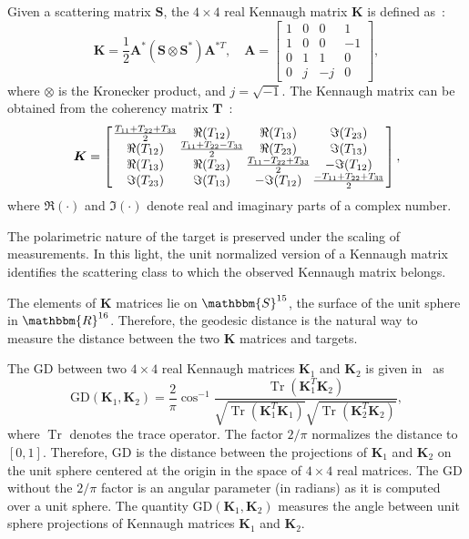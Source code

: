 \documentclass[journal]{IEEEtran}
\DeclareMathOperator{\Tr}{Tr}
\begin{document}
	Given a scattering matrix $\bm{S}$, the $4 \times 4$ real Kennaugh matrix $\bm{K}$ is defined as~\cite{Pottier09}:
	\begin{equation}
		\bm{K} = \frac{1}{2}\bm{A}^*(\bm{S} \otimes \bm{S}^*) \bm{A}^{*T}, \quad \bm{A} = \left[
		\begin{array}{cccc}
			1 & 0 & 0 & 1\\
			1 & 0 & 0 & -1\\
			0 & 1 & 1 & 0\\
			0 & j & -j & 0
		\end{array}\right],
	\end{equation}
	where $\otimes$ is the Kronecker product, and  $j = \sqrt{-1}$.
	The Kennaugh matrix can be obtained from the coherency matrix $\bm{T}$~\cite{PolarisationApplicationsRemoteSensing}:
	\begin{equation}
		\label{incoKen}
		\bm{K} =
		\left[\arraycolsep=.7pt
		\begin{array}{cccc}
			\frac{T_{11}+T_{22}+ T_{33}}{2} & \Re(T_{12}) & \Re(T_{13}) & \Im(T_{23})\\
			\Re(T_{12}) & \frac{T_{11}+T_{22}-T_{33}}{2} & \Re(T_{23}) & \Im(T_{13})\\
			\Re(T_{13}) & \Re(T_{23}) & \frac{T_{11}-T_{22}+T_{33}}{2} & - \Im(T_{12})\\
			\Im(T_{23}) & \Im(T_{13}) & - \Im(T_{12}) &\frac{-T_{11}+T_{22}+T_{33}}{2}
		\end{array}\right],
	\end{equation}
	where $\Re(\cdot)$ and $\Im(\cdot)$ denote real and imaginary parts of a complex number. 
	
	The polarimetric nature of the target is preserved under the scaling of measurements. 
	In this light, the unit normalized version of a Kennaugh matrix identifies the scattering class to which the observed Kennaugh matrix belongs.
	
	The elements of $\bm{K}$ matrices lie on $\mathbbm{S}^{15}$, the surface of the unit sphere in $\mathbbm{R}^{16}$. 
	Therefore, the geodesic distance is the natural way to measure the distance between the two $\bm{K}$ matrices and targets. 
	
	The $\text{GD}$ between two $4 \times 4$ real Kennaugh matrices $\bm{K}_1$ and $\bm{K}_2$ is given in~\cite{APolSARScatteringPowerFactorizationFrameworkandNovelRollInvariantParametersBasedUnsupervisedClassificationSchemeUsingaGeodesicDistanceinpress} as
	\begin{equation}
		\text{GD}(\bm{K}_1,\bm{K}_2) =  \frac{2}{\pi} \cos^{-1}\frac{\Tr(\bm{K}_1^T\bm{K}_2)}{\sqrt{\Tr(\bm{K}_1^T\bm{K}_1)}\sqrt{\Tr(\bm{K}_2^T\bm{K}_2)}} ,
		\label{eq:GD_Ken}
	\end{equation}
	where $\Tr$ denotes the trace operator. 
	The factor $2/\pi$ normalizes the distance to $[0,1]$. 
	Therefore, $\text{GD}$ is the distance between the projections of $\bm{K}_1$ and $\bm{K}_2$ on the unit sphere centered at the origin in the space of $4 \times 4$ real matrices. 
	The $\text{GD}$ without the $2/\pi$ factor is an angular parameter (in radians) as it is computed over a unit sphere. 
	The quantity $\text{GD}(\bm{K}_1, \bm{K}_2)$ measures the angle between unit sphere projections of Kennaugh matrices $\bm{K}_1$ and  $\bm{K}_2$.
	
\end{document}
